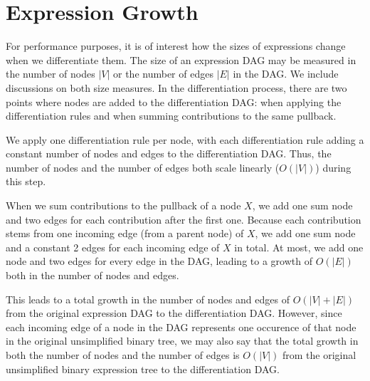 \documentclass[12pt, a4paper]{report}
\begin{document}
\section{Expression Growth}
For performance purposes, it is of interest how the sizes of expressions change when we differentiate them.
The size of an expression DAG may be measured in the number of nodes $|V|$ or the number of edges $|E|$ in the DAG.
We include discussions on both size measures.
In the differentiation process, there are two points where nodes are added to the differentiation DAG: when applying the differentiation rules and when summing contributions to the same pullback.

We apply one differentiation rule per node, with each differentiation rule adding a constant number of nodes and edges to the differentiation DAG.
Thus, the number of nodes and the number of edges both scale linearly ($O(|V|)$) during this step.

When we sum contributions to the pullback of a node $X$, we add one sum node and two edges for each contribution after the first one.
Because each contribution stems from one incoming edge (from a parent node) of $X$, we add one sum node and a constant 2 edges for each incoming edge of $X$ in total.
At most, we add one node and two edges for every edge in the DAG, leading to a growth of $O(|E|)$ both in the number of nodes and edges.

This leads to a total growth in the number of nodes and edges of $O(|V| + |E|)$ from the original expression DAG to the differentiation DAG.
However, since each incoming edge of a node in the DAG represents one occurence of that node in the original unsimplified binary tree, we may also say that the total growth in both the number of nodes and the number of edges is $O(|V|)$ from the original unsimplified binary expression tree to the differentiation DAG.
\end{document}
